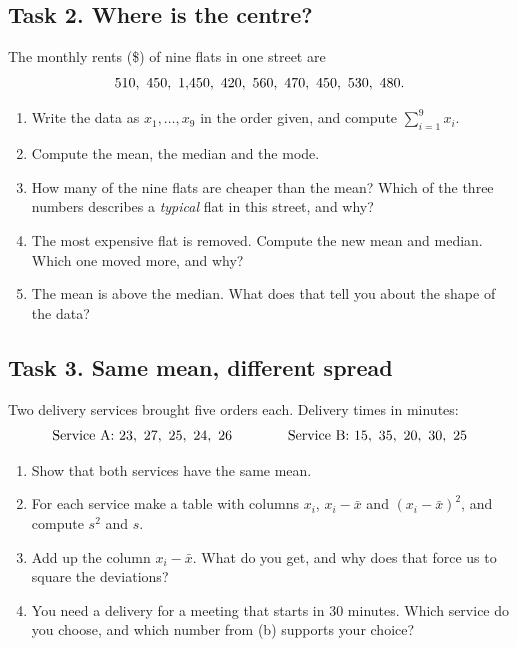 \subsection*{Task 2. Where is the centre?}
The monthly rents (\$) of nine flats in one street are
\[ 510,\ 450,\ 1{,}450,\ 420,\ 560,\ 470,\ 450,\ 530,\ 480. \]
\begin{enumerate}[label=(\alph*)]
  \item Write the data as $x_1, \dots, x_9$ in the order given, and compute $\sum_{i=1}^{9} x_i$.
  \item Compute the mean, the median and the mode.
  \item How many of the nine flats are cheaper than the mean? Which of the three numbers describes a \emph{typical}
        flat in this street, and why?
  \item The most expensive flat is removed. Compute the new mean and median. Which one moved more, and why?
  \item The mean is above the median. What does that tell you about the shape of the data?
\end{enumerate}

\subsection*{Task 3. Same mean, different spread}
Two delivery services brought five orders each. Delivery times in minutes:
\[ \text{Service A: } 23,\ 27,\ 25,\ 24,\ 26 \qquad\qquad \text{Service B: } 15,\ 35,\ 20,\ 30,\ 25 \]
\begin{enumerate}[label=(\alph*)]
  \item Show that both services have the same mean.
  \item For each service make a table with columns $x_i$, $x_i - \bar{x}$ and $(x_i - \bar{x})^2$, and compute $s^2$ and
        $s$.
  \item Add up the column $x_i - \bar{x}$. What do you get, and why does that force us to square the deviations?
  \item You need a delivery for a meeting that starts in 30 minutes. Which service do you choose, and which number
        from (b) supports your choice?
\end{enumerate}

